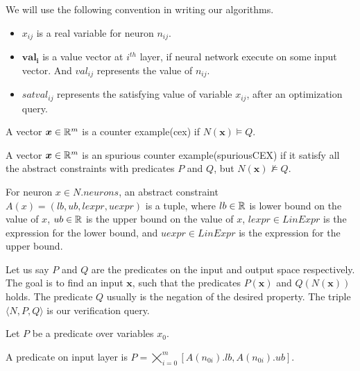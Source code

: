 

We will use the following convention in writing our algorithms.
\begin{itemize}
\item $x_{ij}$ is a real variable for neuron $n_{ij}$.
\item $\boldsymbol{val_{i}}$ is a value vector at $i^{th}$ layer, if neural network execute on some input vector. And $val_{ij}$ represents the value of $n_{ij}$. 
\item $satval_{ij}$ represents the satisfying value of variable $x_{ij}$, after an optimization query.
\end{itemize}


\begin{df}
  A vector $\boldsymbol{x} \in \mathbb{R}^m$ is a counter example(cex) if $N(\boldsymbol{x}) \models Q$.  
\end{df}

\begin{df}
  A vector $\boldsymbol{x} \in \mathbb{R}^m$ is an spurious counter example(spuriousCEX) if it satisfy all the abstract constraints
  with predicates $P$ and $Q$, but $N(\boldsymbol{x}) \nvDash Q$. 
\end{df}


\begin{df}
  For neuron $x \in N.neurons$,
  an abstract constraint $A(x) = (lb,ub, lexpr, uexpr)$ is a tuple, where
  $lb \in \mathbb{R}$ is lower bound on the value of $x$,
  $ub \in \mathbb{R}$ is the upper bound on the value of  $x$,
  $lexpr \in LinExpr$ is the expression for the lower bound, and
  $uexpr \in LinExpr$ is the expression for the upper bound.
\end{df}

Let us say $P$ and $Q$ are the predicates on the input and output space respectively. 
The goal is to find an input $\boldsymbol{x}$, such that the predicates $P(\boldsymbol{x})$ and 
$Q(N(\boldsymbol{x}))$ holds. The predicate $Q$ usually is the negation of the desired property. 
The triple $\langle N, P, Q \rangle$ is our verification query. 


Let $P$ be a predicate over variables $x_0$.

\begin{df}
  A predicate on input layer is $P = \bigtimes_{i=0}^{m}[A(n_{0i}).lb, A(n_{0i}).ub]$. 
\end{df}


